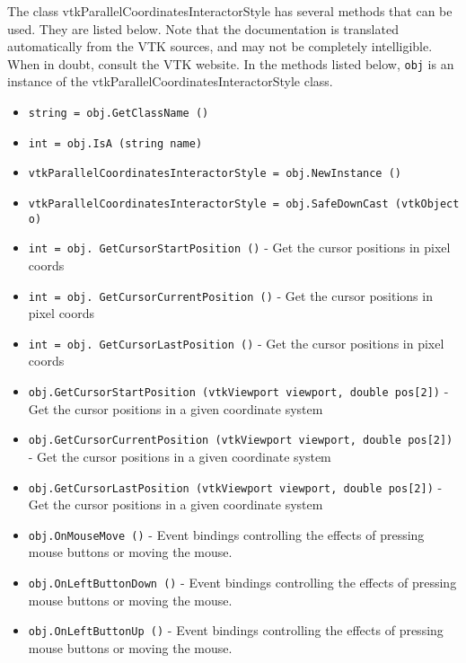 The class vtkParallelCoordinatesInteractorStyle has several methods that can be used.
  They are listed below.
Note that the documentation is translated automatically from the VTK sources,
and may not be completely intelligible.  When in doubt, consult the VTK website.
In the methods listed below, \verb|obj| is an instance of the vtkParallelCoordinatesInteractorStyle class.
\begin{itemize}
\item  \verb|string = obj.GetClassName ()|

\item  \verb|int = obj.IsA (string name)|

\item  \verb|vtkParallelCoordinatesInteractorStyle = obj.NewInstance ()|

\item  \verb|vtkParallelCoordinatesInteractorStyle = obj.SafeDownCast (vtkObject o)|

\item  \verb|int = obj. GetCursorStartPosition ()| -  Get the cursor positions in pixel coords

\item  \verb|int = obj. GetCursorCurrentPosition ()| -  Get the cursor positions in pixel coords

\item  \verb|int = obj. GetCursorLastPosition ()| -  Get the cursor positions in pixel coords

\item  \verb|obj.GetCursorStartPosition (vtkViewport viewport, double pos[2])| -  Get the cursor positions in a given coordinate system

\item  \verb|obj.GetCursorCurrentPosition (vtkViewport viewport, double pos[2])| -  Get the cursor positions in a given coordinate system

\item  \verb|obj.GetCursorLastPosition (vtkViewport viewport, double pos[2])| -  Get the cursor positions in a given coordinate system

\item  \verb|obj.OnMouseMove ()| -  Event bindings controlling the effects of pressing mouse buttons
 or moving the mouse.

\item  \verb|obj.OnLeftButtonDown ()| -  Event bindings controlling the effects of pressing mouse buttons
 or moving the mouse.

\item  \verb|obj.OnLeftButtonUp ()| -  Event bindings controlling the effects of pressing mouse buttons
 or moving the mouse.


\end{itemize}

